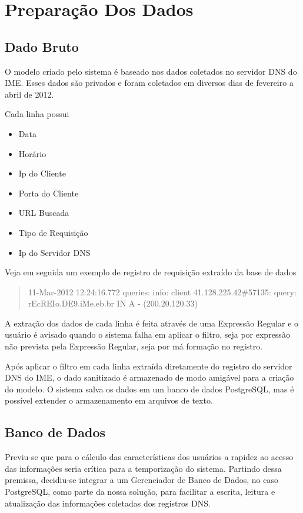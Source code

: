 \chapter{Preparação Dos Dados}

\section{Dado Bruto}
O modelo criado pelo sistema é baseado nos dados coletados no servidor DNS do IME. Esses dados são privados e foram coletados em diversos dias de fevereiro a abril de 2012.

Cada linha possui
\begin{itemize}
\item Data
\item Horário
\item Ip do Cliente
\item Porta do Cliente
\item URL Buscada
\item Tipo de Requisição
\item Ip do Servidor DNS
\end{itemize}

Veja em seguida um exemplo de registro de requisição extraído da base de dados

\begin{quote}
11-Mar-2012 12:24:16.772 queries: info: client 41.128.225.42\#57135: query: rEcREIo.DE9.iMe.eb.br IN A - (200.20.120.33)
\end{quote}

A extração dos dados de cada linha é feita através de uma Expressão Regular e o usuário é avisado quando o sistema falha em aplicar o filtro, seja por expressão não prevista pela Expressão Regular, seja por má formação no registro. 

Após aplicar o filtro em cada linha extraída diretamente do registro do servidor DNS do IME, o dado sanitizado é armazenado de modo amigável para a criação do modelo. O sistema salva os dados em um banco de dados PostgreSQL, mas é possível extender o armazenamento em arquivos de texto.

\section{Banco de Dados}
Previu-se que para o cálculo das características dos usuários a rapidez ao acesso das informações seria crítica para a temporização do sistema. Partindo dessa premissa, decidiu-se integrar a um Gerenciador de Banco de Dados, no caso PostgreSQL, como parte da nossa solução, para facilitar a escrita, leitura e atualização das informações coletadas dos registros DNS.

